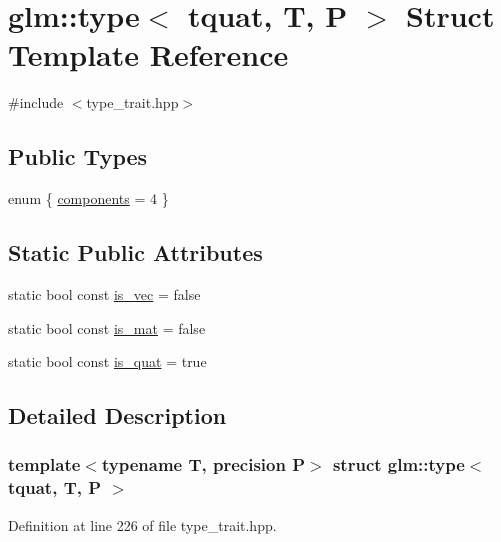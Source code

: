 \hypertarget{structglm_1_1type_3_01tquat_00_01_t_00_01_p_01_4}{}\section{glm\+::type$<$ tquat, T, P $>$ Struct Template Reference}
\label{structglm_1_1type_3_01tquat_00_01_t_00_01_p_01_4}


{\ttfamily \#include $<$type\+\_\+trait.\+hpp$>$}

\subsection*{Public Types}
\begin{DoxyCompactItemize}
\item 
enum \{ \mbox{\hyperlink{structglm_1_1type_3_01tquat_00_01_t_00_01_p_01_4_ab8242348092640248840d8557de54e79a8b712f310325ef2e285014863ac1164d}{components}} = 4
 \}
\end{DoxyCompactItemize}
\subsection*{Static Public Attributes}
\begin{DoxyCompactItemize}
\item 
static bool const \mbox{\hyperlink{structglm_1_1type_3_01tquat_00_01_t_00_01_p_01_4_abfe7f7955372e6397a73ada47415aa56}{is\+\_\+vec}} = false
\item 
static bool const \mbox{\hyperlink{structglm_1_1type_3_01tquat_00_01_t_00_01_p_01_4_a114d99ae019bf324d1b690b045ecbb36}{is\+\_\+mat}} = false
\item 
static bool const \mbox{\hyperlink{structglm_1_1type_3_01tquat_00_01_t_00_01_p_01_4_a2ba7c2222a48ffb612b8617ded2e3d62}{is\+\_\+quat}} = true
\end{DoxyCompactItemize}


\subsection{Detailed Description}
\subsubsection*{template$<$typename T, precision P$>$\newline
struct glm\+::type$<$ tquat, T, P $>$}



Definition at line 226 of file type\+\_\+trait.\+hpp.



